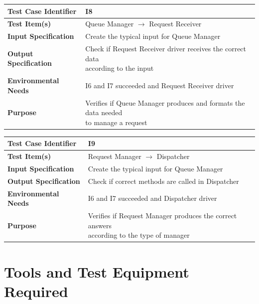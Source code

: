 \documentclass[11pt,titlepage]{article} %
\begin{document}
  \begin{table}[ht!]
    \begin{tabular*}{16cm}{ll}
	\hline
	\textbf{Test Case Identifier} & I8 \\
	\hline
	\textbf{Test Item(s)} & Queue Manager $ \longrightarrow $ Request Receiver \\
	\hline
	\textbf{Input Specification} & Create the typical input for Queue Manager \\
	\hline
	\textbf{Output Specification} & \pbox{20cm}{Check if Request Receiver driver receives the correct data \\ according to the input} \\
	\hline
	\textbf{Environmental Needs} & I6 and I7 succeeded and Request Receiver driver \\
	\hline
	\textbf{Purpose} & \pbox{20cm}{Verifies if Queue Manager produces and formats the data needed \\ to manage a request} \\
	\hline
    \end{tabular*}
  \end{table}
  
  \begin{table}[ht!]
    \begin{tabular*}{16cm}{ll}
	\hline
	\textbf{Test Case Identifier} & I9 \\
	\hline
	\textbf{Test Item(s)} & Request Manager $ \longrightarrow $ Dispatcher \\
	\hline
	\textbf{Input Specification} & Create the typical input for Queue Manager \\
	\hline
	\textbf{Output Specification} & Check if correct methods are called in Dispatcher \\
	\hline
	\textbf{Environmental Needs} & I6 and I7 succeeded and Dispatcher driver \\
	\hline
	\textbf{Purpose} & \pbox{20cm}{Verifies if Request Manager produces the correct answers \\ according to the type of manager} \\
	\hline
    \end{tabular*}
  \end{table}
    
\newpage

\section{Tools and Test Equipment Required}
\end{document}
